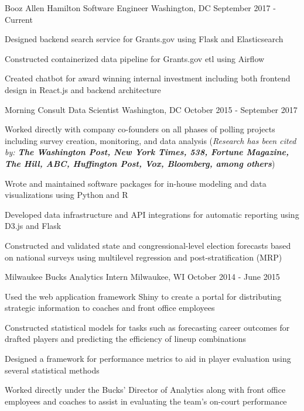 \documentclass[11pt, a4paper]{awesome-cv}
\begin{document}
\begin{cventries}
  \cventry
    {Booz Allen Hamilton}
    {Software Engineer}
    {Washington, DC}
    {September 2017 - Current}
    {
      \begin{cvitems}
        \item{Designed backend search service for Grants.gov using Flask and Elasticsearch}
        \item{Constructed containerized data pipeline for Grants.gov etl using Airflow}
        \item{Created chatbot for award winning internal investment including both frontend design in React.js and backend architecture}
      \end{cvitems}
    }
  \cventry
    {Morning Consult}
    {Data Scientist}
    {Washington, DC}
    {October 2015 - September 2017}
    {
      \begin{cvitems}
        \item{Worked directly with company co-founders on all phases of polling projects including survey creation,
        monitoring, and data analysis (\textit{Research has been cited by: \textbf{The Washington Post, New York Times, 538, Fortune Magazine, The Hill, ABC, Huffington Post, Vox, Bloomberg, among others}})}
        \item{Wrote and maintained software packages for in-house modeling and data visualizations using Python and R}
        \item{Developed data infrastructure and API integrations for automatic reporting using D3.js and Flask}
        \item{Constructed and validated state and congressional-level election forecasts based on national surveys using multilevel regression and post-stratification (MRP)}
      \end{cvitems}
    }
  \cventry
    {Milwaukee Bucks}
    {Analytics Intern}
    {Milwaukee, WI}
    {October 2014 - June 2015}
    {
      \begin{cvitems}
        \item{Used the web application framework Shiny to create a portal for distributing strategic information to coaches and front office employees}
        \item{Constructed statistical models for tasks such as forecasting career outcomes for drafted players
and predicting the efficiency of lineup combinations}
         \item{Designed a framework for performance metrics to aid in player evaluation using several statistical
methods}
        \item{Worked directly under the Bucks’ Director of Analytics along with front office employees and
coaches to assist in evaluating the team’s on-court performance}
      \end{cvitems}
    }

\end{cventries}
\end{document}
